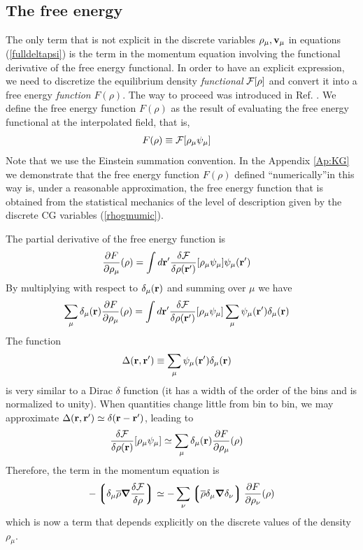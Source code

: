 \documentclass[b5paper,openright,10pt]{book}
\newcommand{\llg}{\left\lgroup}
\newcommand{\rlg}{\right\rgroup}
\begin{document}
\subsection{The free energy}
The  only  term  that  is  not  explicit  in  the  discrete  variables
$\rho_\mu,{\bf v}_\mu$ in equations (\ref{fulldeltapsi}) is the term
in the  momentum equation involving  the functional derivative  of the
free energy  functional. In order  to have an explicit  expression, we
need to discretize the  equilibrium density \textit{functional} ${\cal
  F}[\rho]$ and convert it into a  free energy  \textit{function}
$F(\rho)$.    The    way    to   proceed    was    introduced    in
Ref. \cite{DelaTorre2015}.   We define  the free energy function $F(\rho)$
 as  the result of  evaluating the free energy  functional at
the interpolated field, that is,
\begin{align}
  F(\rho)&\equiv{\cal F}[\rho_\mu\psi_\mu]
\label{DefF}
\end{align}
Note that we use the Einstein summation convention. 
In the  Appendix \ref{Ap:KG} we  demonstrate that the free  energy function
$F(\rho)$ defined  ``numerically''in this  way is, under  a reasonable
approximation,  the free  energy function  that is  obtained from  the
statistical  mechanics  of  the  level of  description  given  by  the
discrete CG variables (\ref{rhogmumic}).

The partial derivative of the free energy function is
\begin{align}
\frac{\partial  F}{\partial \rho_\mu}(\rho)&=\int d{\bf r}'\frac{\delta {\cal F}}{\delta \rho({\bf r}')}[\rho_\mu\psi_\mu]\psi_\mu({\bf r}')
\end{align}
By multiplying with respect to $\delta_\mu({\bf r})$ and summing over $\mu$ we have
\begin{align}
\sum_\mu\delta_\mu({\bf r})\frac{\partial  F}{\partial \rho_\mu}(\rho)
&=\int d{\bf r}'\frac{\delta {\cal F}}{\delta \rho({\bf r}')}[\rho_\mu\psi_\mu]
\sum_\mu\psi_\mu({\bf r}')\delta_\mu({\bf r})
\end{align}
The  function
\begin{align}
\Delta({\bf  r},{\bf  r}')&\equiv\sum_\mu\psi_\mu({\bf  r}')\delta_\mu({\bf r})  
\label{Delta}
\end{align}
 is  very similar to a  Dirac $\delta$ function
(it  has a  width  of the  order  of  the bins  and  is normalized  to
unity).  When  quantities  change  little  from bin  to  bin,  we  may
approximate $\Delta({\bf r},{\bf r}')\simeq \delta({\bf r}-{\bf r}')$,
leading to
\begin{align}
\frac{\delta {\cal F}}{\delta \rho({\bf r})}[\rho_\mu\psi_\mu]
&\simeq\sum_\mu\delta_\mu({\bf r})\frac{\partial  F}{\partial \rho_\mu}(\rho)
\label{gradF}
\end{align}
Therefore, the term in the momentum equation is
\begin{align}
-\llg
\delta_{\mu}\overline{\rho}\boldsymbol{\nabla}\frac{\delta{\cal F}}{\delta\rho}\rlg
\simeq  -\sum_\nu\llg\overline{\rho}\delta_{\mu}\boldsymbol{\nabla}\delta_{\nu}\rlg
\frac{\partial  F}{\partial \rho_{\nu}}(\rho)
\end{align}
which is now a term that depends explicitly on the discrete values of the density $\rho_\mu$.
\end{document}
